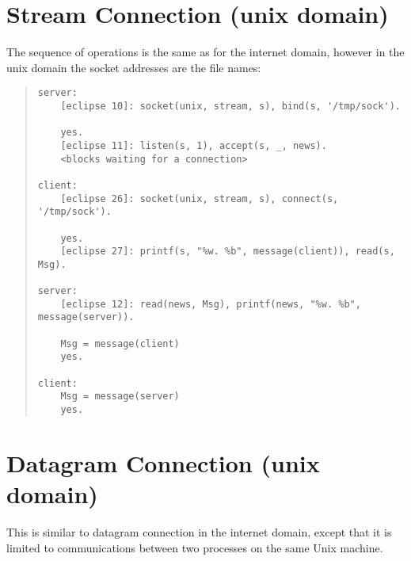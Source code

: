 \section{Stream Connection (unix domain)}
The sequence of operations is the same as for the internet domain,
however in the unix domain the socket addresses are
the file names:

\begin{quote}
\begin{verbatim}
server:
    [eclipse 10]: socket(unix, stream, s), bind(s, '/tmp/sock').

    yes.
    [eclipse 11]: listen(s, 1), accept(s, _, news).
    <blocks waiting for a connection>

client:
    [eclipse 26]: socket(unix, stream, s), connect(s, '/tmp/sock').

    yes.
    [eclipse 27]: printf(s, "%w. %b", message(client)), read(s, Msg).

server:
    [eclipse 12]: read(news, Msg), printf(news, "%w. %b", message(server)).

    Msg = message(client)
    yes.

client:
    Msg = message(server)
    yes.
\end{verbatim}
\end{quote}

\section{Datagram Connection (unix domain)}
This is similar to datagram connection in the internet domain, except that
it is limited to communications between two processes on the same Unix
machine.

